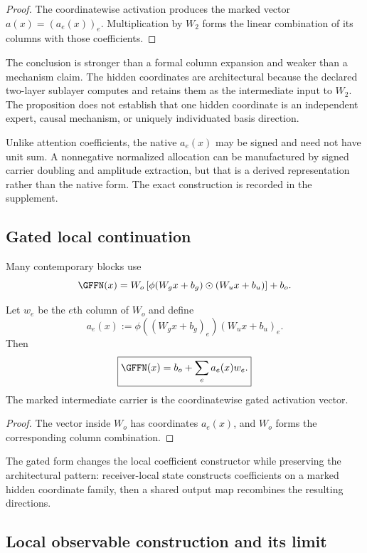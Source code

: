 \begin{proof}
The coordinatewise activation produces the marked vector $a(x)=(a_e(x))_e$. Multiplication by $W_2$ forms the linear combination of its columns with those coefficients.
\end{proof}

The conclusion is stronger than a formal column expansion and weaker than a mechanism claim. The hidden coordinates are architectural because the declared two-layer sublayer computes and retains them as the intermediate input to $W_2$. The proposition does not establish that one hidden coordinate is an independent expert, causal mechanism, or uniquely individuated basis direction.

Unlike attention coefficients, the native $a_e(x)$ may be signed and need not have unit sum. A nonnegative normalized allocation can be manufactured by signed carrier doubling and amplitude extraction, but that is a derived representation rather than the native form. The exact construction is recorded in the supplement.

\subsection{Gated local continuation}

Many contemporary blocks use
\begin{equation}\label{eq:gated-ffn}
\GFFN(x)
=
W_o\left[\phi(W_gx+b_g)\odot(W_ux+b_u)\right]+b_o.
\end{equation}

\begin{proposition}\label{prop:gated-ffn}
Let $w_e$ be the $e$th column of $W_o$ and define
\[
a_e(x)
:=
\phi((W_gx+b_g)_e)(W_ux+b_u)_e.
\]
Then
\[
\boxed{\GFFN(x)=b_o+\sum_e a_e(x)w_e.}
\]
The marked intermediate carrier is the coordinatewise gated activation vector.
\end{proposition}

\begin{proof}
The vector inside $W_o$ has coordinates $a_e(x)$, and $W_o$ forms the corresponding column combination.
\end{proof}

The gated form changes the local coefficient constructor while preserving the architectural pattern: receiver-local state constructs coefficients on a marked hidden coordinate family, then a shared output map recombines the resulting directions.

\subsection{Local observable construction and its limit}

